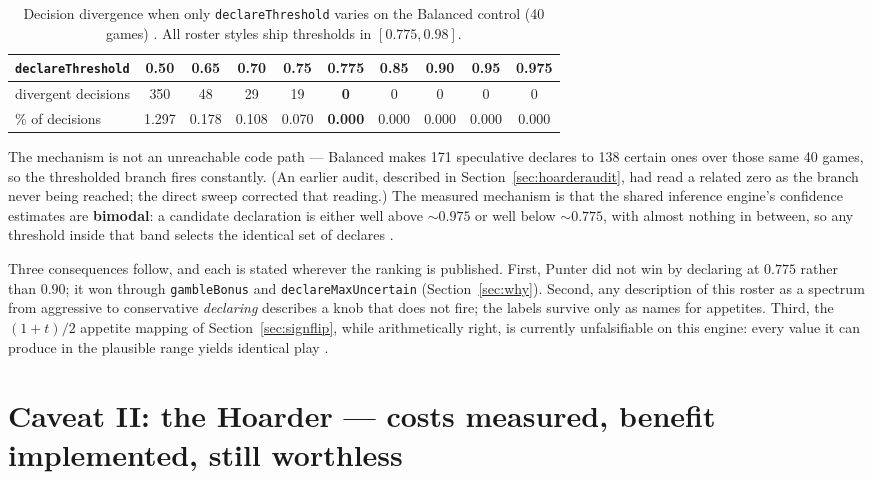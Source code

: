 \documentclass[11pt]{article}
\newcommand{\code}[1]{\texttt{#1}}
\begin{document}
\begin{table}[t]
\centering
\caption{Decision divergence when only \code{declareThreshold} varies on the Balanced
control (40 games) \cite{styles}. All roster styles ship thresholds in $[0.775, 0.98]$.}
\label{tab:sweep}
\footnotesize
\begin{tabular}{@{}lccccccccc@{}}
\toprule
\code{declareThreshold} & 0.50 & 0.65 & 0.70 & 0.75 & \textbf{0.775} & 0.85 & 0.90 & 0.95 & 0.975 \\
\midrule
divergent decisions & 350 & 48 & 29 & 19 & \textbf{0} & 0 & 0 & 0 & 0 \\
\% of decisions & 1.297 & 0.178 & 0.108 & 0.070 & \textbf{0.000} & 0.000 & 0.000 & 0.000 & 0.000 \\
\bottomrule
\end{tabular}
\end{table}

The mechanism is not an unreachable code path --- Balanced makes 171 speculative declares to
138 certain ones over those same 40 games, so the thresholded branch fires constantly. (An
earlier audit, described in Section~\ref{sec:hoarderaudit}, had read a related zero as the
branch never being reached; the direct sweep corrected that reading.) The measured mechanism
is that the shared inference engine's confidence estimates are \textbf{bimodal}: a candidate
declaration is either well above ${\sim}0.975$ or well below ${\sim}0.775$, with almost
nothing in between, so any threshold inside that band selects the identical set of declares
\cite{styles}.

Three consequences follow, and each is stated wherever the ranking is published. First,
Punter did not win by declaring at $0.775$ rather than $0.90$; it won through
\code{gambleBonus} and \code{declareMaxUncertain} (Section~\ref{sec:why}). Second, any
description of this roster as a spectrum from aggressive to conservative \emph{declaring}
describes a knob that does not fire; the labels survive only as names for appetites. Third,
the $(1+t)/2$ appetite mapping of Section~\ref{sec:signflip}, while arithmetically right, is
currently unfalsifiable on this engine: every value it can produce in the plausible range
yields identical play \cite{styles}.

\section{Caveat II: the Hoarder --- costs measured, benefit implemented, still worthless}
\label{sec:hoarder}
\end{document}
